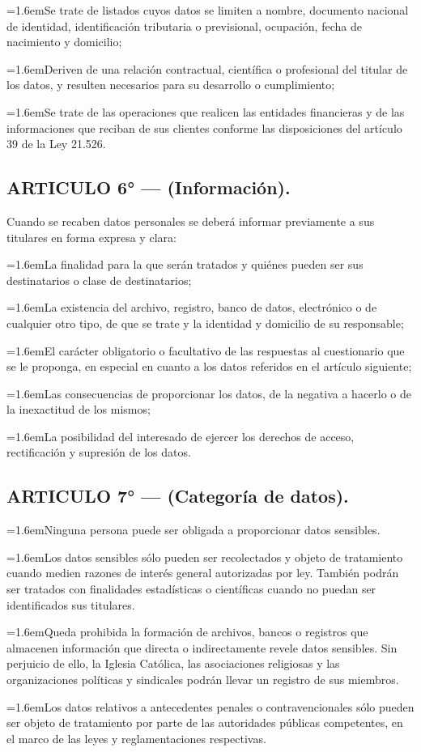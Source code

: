 \documentclass[10pt,a4paper]{article}
\newcommand{\articulo}[1]{\subsection{#1}}
\newcommand{\inciso}[2]{\par{\hangindent=1.6em\hangafter=1\makebox[1.6em][l]{#1}#2\par}}
\begin{document}
\inciso{c)}{Se trate de listados cuyos datos se limiten a nombre, documento nacional de identidad, identificación tributaria o previsional, ocupación, fecha de nacimiento y domicilio;}

\inciso{d)}{Deriven de una relación contractual, científica o profesional del titular de los datos, y resulten necesarios para su desarrollo o cumplimiento;}

\inciso{e)}{Se trate de las operaciones que realicen las entidades financieras y de las informaciones que reciban de sus clientes conforme las disposiciones del artículo 39 de la Ley 21.526.}

\articulo{ARTICULO 6° — (Información).}
Cuando se recaben datos personales se deberá informar previamente a sus titulares en forma expresa y clara:

\inciso{a)}{La finalidad para la que serán tratados y quiénes pueden ser sus destinatarios o clase de destinatarios;}

\inciso{b)}{La existencia del archivo, registro, banco de datos, electrónico o de cualquier otro tipo, de que se trate y la identidad y domicilio de su responsable;}

\inciso{c)}{El carácter obligatorio o facultativo de las respuestas al cuestionario que se le proponga, en especial en cuanto a los datos referidos en el artículo siguiente;}

\inciso{d)}{Las consecuencias de proporcionar los datos, de la negativa a hacerlo o de la inexactitud de los mismos;}

\inciso{e)}{La posibilidad del interesado de ejercer los derechos de acceso, rectificación y supresión de los datos.}

\articulo{ARTICULO 7° — (Categoría de datos).}
\inciso{1.}{Ninguna persona puede ser obligada a proporcionar datos sensibles.}

\inciso{2.}{Los datos sensibles sólo pueden ser recolectados y objeto de tratamiento cuando medien razones de interés general autorizadas por ley. También podrán ser tratados con finalidades estadísticas o científicas cuando no puedan ser identificados sus titulares.}

\inciso{3.}{Queda prohibida la formación de archivos, bancos o registros que almacenen información que directa o indirectamente revele datos sensibles. Sin perjuicio de ello, la Iglesia Católica, las asociaciones religiosas y las organizaciones políticas y sindicales podrán llevar un registro de sus miembros.}

\inciso{4.}{Los datos relativos a antecedentes penales o contravencionales sólo pueden ser objeto de tratamiento por parte de las autoridades públicas competentes, en el marco de las leyes y reglamentaciones respectivas.}
\end{document}
